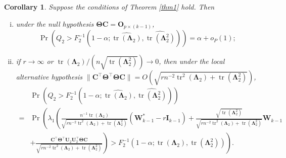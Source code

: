 \documentclass[12pt]{article} %
\DeclareMathOperator{\mytr}{tr}
\newcommand{\bC}{\mathbf{C}}
\newcommand{\bO}{\mathbf{O}}
\newcommand{\bI}{\mathbf{I}}
\newcommand{\bU}{\mathbf{U}}
\newcommand{\bW}{\mathbf{W}}
\newcommand{\bfsym}[1]{\ensuremath{\boldsymbol{#1}}}
\def\bLambda {\bfsym {\Lambda}}
\def\bTheta {\bfsym {\Theta}}
\newtheorem{corollary}{Corollary}
\theoremstyle{definition}
\begin{document}
\begin{corollary}
    Suppose the conditions of Theorem \ref{thm1} hold.
    Then
    \begin{enumerate}[(i)]
        \item 
            under the null hypothesis $\bTheta \bC=\bO_{p\times (k-1)}$,
\begin{equation*}
    \Pr
    \left(
        Q_2
    >
    F_2^{-1}\left(1-\alpha;\widehat{\mytr(\bLambda_2)},\widehat{\mytr(\bLambda_2^2)}\right)
\right)=\alpha +o_P(1)
        ;
\end{equation*}
        \item
            if $r\to \infty$ or $\mytr(\bLambda_2)/(n \sqrt{\mytr(\bLambda_2^2)})\to 0$, then under the local alternative hypothesis $\|\bC^\top \bTheta^\top \bTheta \bC\|=O(\sqrt{
        rn^{-2} \mytr^2 (\bLambda_2) + \mytr(\bLambda_2^2)
            })$,
\begin{equation*}
\begin{split}
    &\Pr
    \left(
        Q_2
    >
    F_2^{-1}\left(1-\alpha;\widehat{\mytr(\bLambda_2)},\widehat{\mytr(\bLambda_2^2)}\right)
\right)
\\
=
    &\Pr
    \left(
\lambda_1
\left(
\frac{
    n^{-1} \mytr(\bLambda_2)
}{
    \sqrt{
        rn^{-2} \mytr^2 (\bLambda_2) + \mytr(\bLambda_2^2)
    }
}
(\bW_{k-1}^* - r\bI_{k-1})
+
\frac{
    \sqrt{\mytr(\bLambda_2^2)}
}{
    \sqrt{
        rn^{-2} \mytr^2 (\bLambda_2) + \mytr(\bLambda_2^2)
    }
}
\bW_{k-1}
\right.\right.
\\
&
+\left.\left.
\frac{
    \bC^\top \bTheta^\top \bU_2 \bU_2^\top \bTheta \bC
}{
    \sqrt{
        rn^{-2} \mytr^2 (\bLambda_2) + \mytr(\bLambda_2^2)
    }
}
\right)
    >
    F_2^{-1}\left(1-\alpha;\mytr(\bLambda_2),\mytr(\bLambda_2^2)\right)
\right)
.
\end{split}
\end{equation*}
    \end{enumerate}
    \label{kuCor2}
\end{corollary}
\end{document}
